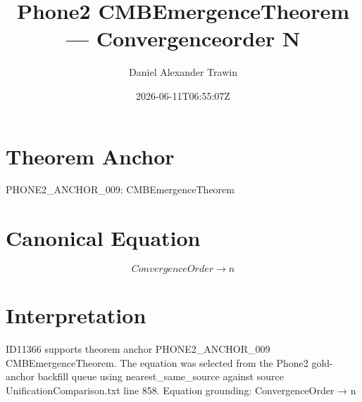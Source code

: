 \documentclass[11pt]{article}
\title{Phone2 CMBEmergenceTheorem — Convergenceorder N}
\author{Daniel Alexander Trawin}
\date{2026-06-11T06:55:07Z}
\begin{document}
\maketitle
\section*{Theorem Anchor}
PHONE2_ANCHOR_009: CMBEmergenceTheorem
\section*{Canonical Equation}
\[
ConvergenceOrder → n
\]
\section*{Interpretation}
ID11366 supports theorem anchor PHONE2_ANCHOR_009 CMBEmergenceTheorem. The equation was selected from the Phone2 gold-anchor backfill queue using nearest_same_source against source UnificationComparison.txt line 858. Equation grounding: ConvergenceOrder → n
\end{document}
